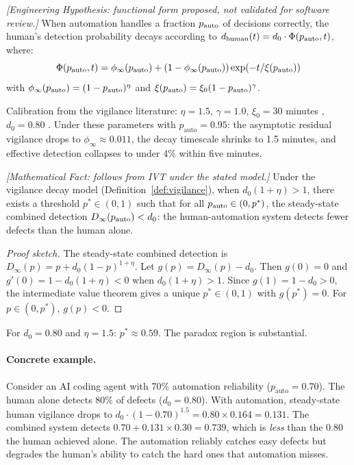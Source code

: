 \begin{definition}
\emph{[Engineering Hypothesis: functional form proposed, not validated for software review.]}
\label{def:vigilance}
When automation handles a fraction $p_{\textup{auto}}$ of decisions correctly, the human's detection probability decays according to $d_{\textup{human}}(t) = d_0 \cdot \Phi(p_{\textup{auto}}, t)$, where:
\begin{equation}
\Phi(p_{\textup{auto}}, t) = \phi_\infty(p_{\textup{auto}}) + (1 - \phi_\infty(p_{\textup{auto}})) \exp\!\left(-t / \xi(p_{\textup{auto}})\right)
\end{equation}
with $\phi_\infty(p_{\textup{auto}}) = (1 - p_{\textup{auto}})^\eta$ and $\xi(p_{\textup{auto}}) = \xi_0 (1 - p_{\textup{auto}})^\gamma$.
\end{definition}

Calibration from the vigilance literature: $\eta = 1.5$, $\gamma = 1.0$, $\xi_0 = 30$ minutes \citep{mackworth1948breakdown, see1995meta}, $d_0 = 0.80$ \citep{cohen2006best}. Under these parameters with $p_{\text{auto}} = 0.95$: the asymptotic residual vigilance drops to $\phi_\infty \approx 0.011$, the decay timescale shrinks to 1.5 minutes, and effective detection collapses to under 4\% within five minutes.

\begin{theorem}
\emph{[Mathematical Fact: follows from IVT under the stated model.]}
\label{thm:paradox}
Under the vigilance decay model (Definition~\ref{def:vigilance}), when $d_0(1+\eta) > 1$, there exists a threshold $p^* \in (0,1)$ such that for all $p_{\textup{auto}} \in (0, p^*)$, the steady-state combined detection $D_\infty(p_{\textup{auto}}) < d_0$: the human-automation system detects fewer defects than the human alone.
\end{theorem}

\begin{proof}[Proof sketch]
The steady-state combined detection is $D_\infty(p) = p + d_0(1-p)^{1+\eta}$. Let $g(p) = D_\infty(p) - d_0$. Then $g(0) = 0$ and $g'(0) = 1 - d_0(1+\eta) < 0$ when $d_0(1+\eta) > 1$. Since $g(1) = 1 - d_0 > 0$, the intermediate value theorem gives a unique $p^* \in (0,1)$ with $g(p^*) = 0$. For $p \in (0, p^*)$, $g(p) < 0$.
\end{proof}

For $d_0 = 0.80$ and $\eta = 1.5$: $p^* \approx 0.59$. The paradox region is substantial.

\paragraph{Concrete example.} Consider an AI coding agent with 70\% automation reliability ($p_{\text{auto}} = 0.70$). The human alone detects 80\% of defects ($d_0 = 0.80$). With automation, steady-state human vigilance drops to $d_0 \cdot (1-0.70)^{1.5} = 0.80 \times 0.164 = 0.131$. The combined system detects $0.70 + 0.131 \times 0.30 = 0.739$, which is \emph{less} than the 0.80 the human achieved alone. The automation reliably catches easy defects but degrades the human's ability to catch the hard ones that automation misses.

